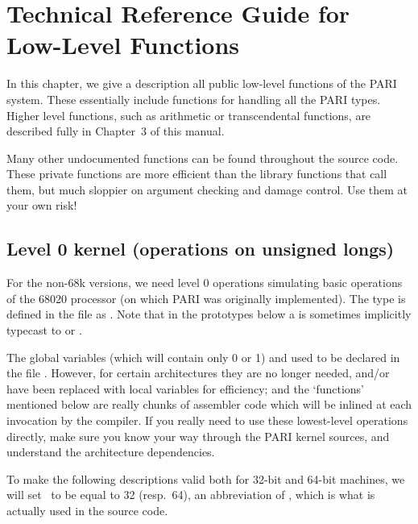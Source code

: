 %
%
\chapter{Technical Reference Guide for Low-Level Functions}

In this chapter, we give a description all public low-level functions of the
PARI system. These essentially include functions for handling all the PARI
types. Higher level functions, such as arithmetic or transcendental
functions, are described fully in Chapter~3 of this manual.

Many other undocumented functions can be found throughout the source code.
These private functions are more efficient than the library functions that
call them, but much sloppier on argument checking and damage control. Use
them at your own risk!

\section{Level 0 kernel (operations on unsigned longs)}

\noindent
For the non-68k versions, we need level 0 operations simulating basic
operations of the 68020 processor (on which PARI was originally
implemented). The type  is defined in the file  as
. Note that in the prototypes below a  is
sometimes implicitly typecast to  or .

The global  variables  (which will contain
only 0 or 1) and  used to be declared in the file
. However, for certain architectures they are no longer
needed, and/or have been replaced with local variables for efficiency;
and the `functions' mentioned below are really chunks of assembler code which
will be inlined at each invocation by the compiler. If you really need to
use these lowest-level operations directly, make sure you know your way
through the PARI kernel sources, and understand the architecture dependencies.

To make the following descriptions valid both for 32-bit and 64-bit
machines, we will set \B\ to be equal to 32 (resp.~64), an abbreviation of
, which is what is actually used in the source code.

